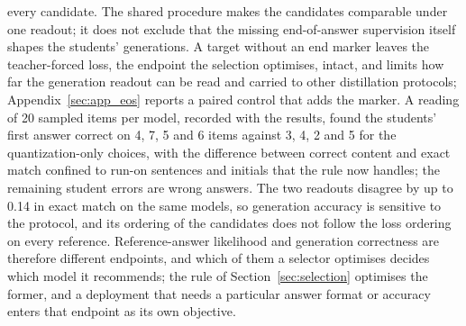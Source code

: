 every candidate. The shared procedure makes the candidates comparable under one readout; it does not
exclude that the missing end-of-answer supervision itself shapes the students' generations. A target
without an end marker leaves the teacher-forced loss, the endpoint the selection optimises, intact,
and limits how far the generation readout can be read and carried to other distillation protocols;
Appendix~\ref{sec:app_eos} reports a paired control that adds the marker. A reading of 20 sampled items per model, recorded with the results, found the students'
first answer correct on 4, 7, 5 and 6 items against 3, 4, 2 and 5 for the quantization-only
choices, with the difference between correct content and exact match confined to run-on sentences
and initials that the rule now handles; the remaining student errors are wrong answers. The two
readouts disagree by up to 0.14 in exact match on the same models, so generation accuracy is
sensitive to the protocol, and its ordering of the candidates does not follow the loss ordering
on every reference. Reference-answer likelihood and generation correctness are therefore different
endpoints, and which of them a selector optimises decides which model it recommends; the rule of
Section~\ref{sec:selection} optimises the former, and a deployment that needs a particular answer
format or accuracy enters that endpoint as its own objective.


